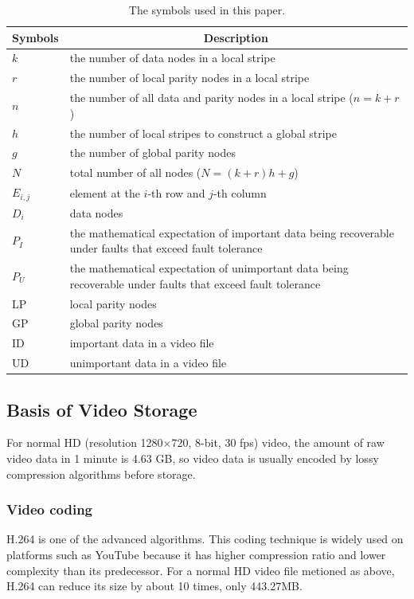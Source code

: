 \documentclass[sigconf]{acmart}
\begin{document}
\begin{table}[]
\caption{The symbols used in this paper.}\label{parameter}
\centering\small
\begin{tabular}{|p{1cm}<{\centering}|p{6.5cm}|}
\hline \hline
Symbols & \multicolumn{1}{c|}{Description} \\ \hline
$k$ & the number of data nodes in a local stripe \\ \hline
$r$ & the number of local parity nodes in a local stripe \\ \hline
$n$ & the number of all data and parity nodes in a local stripe ($n=k+r$) \\ \hline
$h$ & the number of local stripes to construct a global stripe \\ \hline
$g$ & the number of global parity nodes \\ \hline
$N$ & total number of all nodes ($N=(k+r)h+g$) \\ \hline
$E_{i,j}$ & element at the $i$-th row and $j$-th column \\ \hline
$D_i$ & data nodes \\ \hline
$P_{I}$ & the mathematical expectation of important data being recoverable under faults that exceed fault tolerance \\ \hline
$P_{U}$ & the mathematical expectation of unimportant data being recoverable under faults that exceed fault tolerance \\ \hline
LP & local parity nodes \\ \hline
GP & global parity nodes \\ \hline
ID & important data in a video file \\ \hline
UD & unimportant data in a video file \\ \hline
\end{tabular}
\end{table}


\subsection{Basis of Video Storage}\label{video storage}
For normal HD (resolution 1280$\times$720, 8-bit, 30 fps) video, the amount of raw video data in 1 minute is 4.63 GB, so video data is usually encoded by lossy compression algorithms before storage. 

\subsubsection{Video coding}
H.264 \cite{wiegand2003overview} is one of the advanced algorithms. This coding technique is widely used on platforms such as YouTube because it has higher compression ratio and lower complexity than its predecessor. For a normal HD video file metioned as above, H.264 can reduce its size by about 10 times, only 443.27MB.
\end{document}
